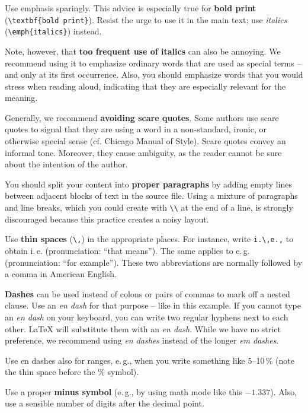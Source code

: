 Use emphasis sparingly. This advice is especially true for \textbf{bold print} (\verb|\textbf{bold print}|). Resist the urge to use it in the main text; use \emph{italics} (\verb|\emph{italics}|) instead.

Note, however, that \textbf{too frequent use of italics} can also be annoying.%
We recommend using it to emphasize ordinary words that are used as special terms – and only at its first occurrence. Also, you should emphasize words that you would stress when reading aloud, indicating that they are especially relevant for the meaning.


Generally, we recommend \textbf{avoiding scare quotes}.%
Some authors use scare quotes to signal that they are using a word in a non-standard, ironic, or otherwise special sense (cf. Chicago Manual of Style). Scare quotes convey an informal tone. Moreover, they cause ambiguity, as the reader cannot be sure about the intention of the author.

You should split your content into \textbf{proper paragraphs} by adding empty lines between adjacent blocks of text in the source file. Using a mixture of paragraphs and line breaks, which you could create with \verb|\\| at the end of a line, is strongly discouraged because this practice creates a noisy layout.

Use \textbf{thin spaces} (\verb|\,|) in the appropriate places. For instance, write \verb|i.\,e.,| to obtain i.\,e. (pronunciation: ``that means''). The same applies to e.\,g. (pronunciation: ``for example''). These two abbreviations are normally followed by a comma in American English.

\textbf{Dashes} can be used instead of colons or pairs of commas to mark off a nested clause. Use an \emph{en dash} for that purpose -- like in this example. If you cannot type an \emph{en dash} on your keyboard, you can write two regular hyphens next to each other. LaTeX will substitute them with an \emph{en dash}. While we have no strict preference, we recommend using \emph{en dashes} instead of the longer \emph{em dashes}.

Use en dashes also for ranges, e.\,g., when you write something like 5--10\,\% (note the thin space before the \% symbol).

Use a proper \textbf{minus symbol} (e.\,g., by using math mode like this \(-1.337\)). Also, use a sensible number of digits after the decimal point.

